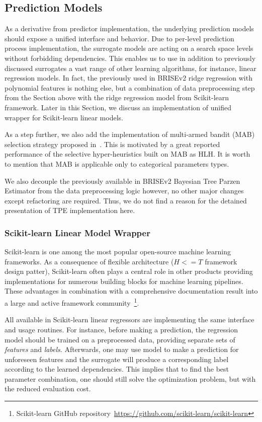 \subsection{Prediction Models}\label{impl: prediction models}
As a derivative from predictor implementation, the underlying prediction models should expose a unified interface and behavior. Due to per-level prediction process implementation, the surrogate models are acting on a search space levels without forbidding dependencies. This enables us to use in addition to previously discussed surrogates a vast range of other learning algorithms, for instance, linear regression models. In fact, the previously used in BRISEv2 ridge regression with polynomial features is nothing else, but a combination of data preprocessing step from the Section above with the ridge regression model from Scikit-learn framework. Later in this Section, we discuss an implementation of unified wrapper for Scikit-learn linear models.

As a step further, we also add the implementation of multi-armed bandit (MAB) selection strategy proposed in~\cite{auer2002finite}. This is motivated by a great reported performance of the selective hyper-heuristics built on MAB as HLH. It is worth to mention that MAB is applicable only to categorical parameters types.

We also decouple the previously available in BRISEv2 Bayesian Tree Parzen Estimator from the data preprocessing logic however, no other major changes except refactoring are required. Thus, we do not find a reason for the detained presentation of TPE implementation here.

\subsubsection{Scikit-learn Linear Model Wrapper}\label{impl: sklearn wrapper}
Scikit-learn is one among the most popular open-source machine learning frameworks. As a consequence of flexible architecture ($H<=T$ framework design patter), Scikit-learn often plays a central role in other products providing implementations for numerous building blocks for machine learning pipelines. These advantages in combination with a comprehensive documentation result into a large and active framework community~\footnote{Scikit-learn GitHub repository~\url{https://github.com/scikit-learn/scikit-learn}}.

All available in Scikit-learn linear regressors are implementing the same interface and usage routines. For instance, before making a prediction, the regression model should be trained on a preprocessed data, providing separate sets of \emph{features} and \emph{labels}. Afterwards, one may use model to make a prediction for unforeseen features and the surrogate will produce a corresponding label according to the learned dependencies. This implies that to find the best parameter combination, one should still solve the optimization problem, but with the reduced evaluation cost.

